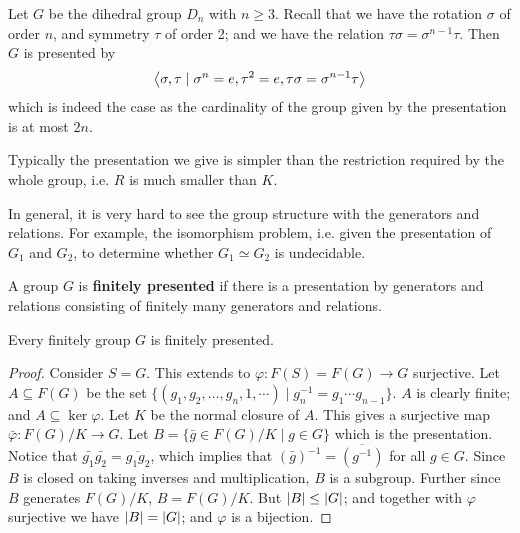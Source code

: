 \begin{example}
    Let $G$ be the dihedral group $D_n$ with $n \geq 3$. Recall that we have the rotation $\sigma$ of order $n$, and symmetry $\tau$ of order 2; and we have the relation $\tau \sigma = \sigma^{n-1} \tau$. Then $G$ is presented by
    \[
        \left\langle  \sigma, \tau \mid \sigma^n = e, \tau^2 = e, \tau \sigma = \sigma^{n-1} \tau  \right\rangle
    \]
    which is indeed the case as the cardinality of the group given by the presentation is at most $2n$.
\end{example}

\begin{remark}
    Typically the presentation we give is simpler than the restriction required by the whole group, i.e. $R$ is much smaller than $K$.
\end{remark}
\nogap
\begin{remark}
    In general, it is very hard to see the group structure with the generators and relations. For example, the isomorphism problem, i.e. given the presentation of $G_1$ and $G_2$, to determine whether $G_1 \simeq G_2$ is undecidable.
\end{remark}

\begin{definition}
    A group $G$ is \textbf{finitely presented} if there is a presentation by generators and relations consisting of finitely many generators and relations.
\end{definition}

\begin{proposition}
    Every finitely group $G$ is finitely presented.
\end{proposition}

\begin{proof}
    Consider $S = G$. This extends to $\varphi: F(S) = F(G) \to G$ surjective. Let $A \subseteq F(G)$ be the set $\{(g_1, g_2, \dots, g_n, 1, \cdots) \mid g_n^{-1} = g_1 \cdots g_{n-1} \}$. $A$ is clearly finite; and $A \subseteq \ker \varphi$. Let $K$ be the normal closure of $A$. This gives a surjective map $\bar{\varphi}: F(G)/K \to G$. Let $B = \{ \bar{g} \in F(G)/K \mid g \in G \}$ which is the presentation. Notice that $\bar{g_1} \bar{g_2} = \overline{g_1 g_2}$, which implies that $(\bar{g})^{-1} = \overline{(g^{-1})}$ for all $g \in G$. Since $B$ is closed on taking inverses and multiplication, $B$ is a subgroup. Further since $B$ generates $F(G)/K$, $B = F(G)/K$. But $\left|B\right| \leq \left|G\right|$; and together with $\varphi$ surjective we have $\left|B\right| = \left|G\right|$; and $\varphi$ is a bijection. 
\end{proof}